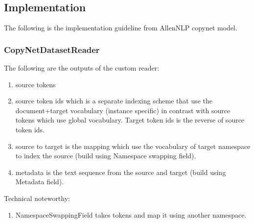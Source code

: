 \documentclass{article}
\begin{document}
\subsection{Implementation}
The following is the implementation guideline from AllenNLP copynet model.
\subsubsection{CopyNetDatasetReader}
The following are the outputs of the custom reader:
\begin{enumerate}
  \item source tokens
  \item source token ids which is a separate indexing scheme that use the document+target vocabulary (instance specific) in contrast with source tokens which use global vocabulary. Target token ids is the reverse of source token ids.
  \item source to target is the mapping which use the vocabulary of target namespace to index the source (build using Namespace swapping field).
  \item metadata is the text sequence from the source and target (build using Metadata field).
\end{enumerate}

Technical noteworthy:
\begin{enumerate}
  \item NamespaceSwappingField takes tokens and map it using another namespace.
\end{enumerate}
\end{document}
